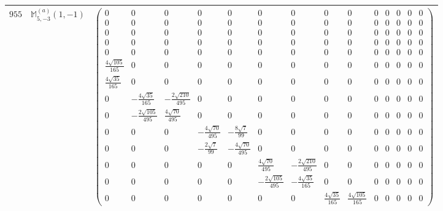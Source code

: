 \documentclass[fleqn,8pt,landscape]{jsarticle}
\begin{document}
\begin{center}
\begin{longtable}{ccc}
$ 955 $ & $ \mathbb{M}_{5,-3}^{(a)}(1,-1) $ & $ \begin{pmatrix} 0 & 0 & 0 & 0 & 0 & 0 & 0 & 0 & 0 & 0 & 0 & 0 & 0 & 0 \\ 0 & 0 & 0 & 0 & 0 & 0 & 0 & 0 & 0 & 0 & 0 & 0 & 0 & 0 \\ 0 & 0 & 0 & 0 & 0 & 0 & 0 & 0 & 0 & 0 & 0 & 0 & 0 & 0 \\ 0 & 0 & 0 & 0 & 0 & 0 & 0 & 0 & 0 & 0 & 0 & 0 & 0 & 0 \\ 0 & 0 & 0 & 0 & 0 & 0 & 0 & 0 & 0 & 0 & 0 & 0 & 0 & 0 \\ \frac{4 \sqrt{105}}{165} & 0 & 0 & 0 & 0 & 0 & 0 & 0 & 0 & 0 & 0 & 0 & 0 & 0 \\ \frac{4 \sqrt{35}}{165} & 0 & 0 & 0 & 0 & 0 & 0 & 0 & 0 & 0 & 0 & 0 & 0 & 0 \\ 0 & - \frac{4 \sqrt{35}}{165} & - \frac{2 \sqrt{210}}{495} & 0 & 0 & 0 & 0 & 0 & 0 & 0 & 0 & 0 & 0 & 0 \\ 0 & - \frac{2 \sqrt{105}}{495} & \frac{4 \sqrt{70}}{495} & 0 & 0 & 0 & 0 & 0 & 0 & 0 & 0 & 0 & 0 & 0 \\ 0 & 0 & 0 & - \frac{4 \sqrt{70}}{495} & - \frac{8 \sqrt{7}}{99} & 0 & 0 & 0 & 0 & 0 & 0 & 0 & 0 & 0 \\ 0 & 0 & 0 & - \frac{2 \sqrt{7}}{99} & - \frac{4 \sqrt{70}}{495} & 0 & 0 & 0 & 0 & 0 & 0 & 0 & 0 & 0 \\ 0 & 0 & 0 & 0 & 0 & \frac{4 \sqrt{70}}{495} & - \frac{2 \sqrt{210}}{495} & 0 & 0 & 0 & 0 & 0 & 0 & 0 \\ 0 & 0 & 0 & 0 & 0 & - \frac{2 \sqrt{105}}{495} & - \frac{4 \sqrt{35}}{165} & 0 & 0 & 0 & 0 & 0 & 0 & 0 \\ 0 & 0 & 0 & 0 & 0 & 0 & 0 & \frac{4 \sqrt{35}}{165} & \frac{4 \sqrt{105}}{165} & 0 & 0 & 0 & 0 & 0 \end{pmatrix} $ \\ \hline

\end{longtable}
\end{center}
\end{document}
